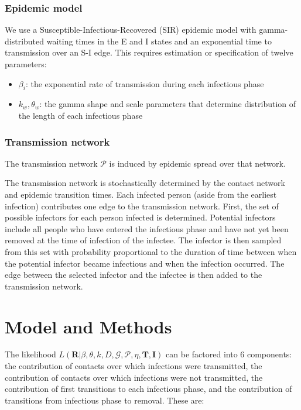 \documentclass[11pt, notitlepage]{article}%
\newcommand{\G}{\mathscr{G}}
\newcommand{\Pnet}{\mathscr{P}}
\numberwithin{equation}{section}
\begin{document}
\subsubsection{Epidemic model}

We use a Susceptible-Infectious-Recovered (SIR) epidemic model with gamma-distributed waiting times in the E and I states and an exponential time to transmission over an S-I edge. This requires estimation or specification of twelve parameters:
\begin{itemize}
\item $\beta_i$: the exponential rate of transmission during each infectious phase
\item $k_w, \theta_w$: the gamma shape and scale parameters that determine distribution of the length of each infectious phase
\end{itemize}

\subsubsection{Transmission network}

The transmission network $\Pnet$ is induced by epidemic spread over that network. 

The transmission network is stochastically determined by the contact network and epidemic transition times. Each infected person (aside from the earliest infection) contributes one edge to the transmission network. First, the set of possible infectors for each person infected is determined. Potential infectors include all people who have entered the infectious phase and have not yet been removed at the time of infection of the infectee. The infector is then sampled from this set with probability proportional to the duration of time between when the potential infector became infectious and when the infection occurred. The edge between the selected infector and the infectee is then added to the transmission network.

\section{Model and Methods}
\label{sec:model}

The likelihood $L(\mathbf{R}| \beta, \theta, k, D, \G, \Pnet, \eta, \mathbf{T}, \mathbf{I})$ can be factored into 6 components: the contribution of contacts over which infections were transmitted, the contribution of contacts over which infections were not transmitted, 
the contribution of first transitions to each infectious phase, and the contribution of transitions from infectious phase to removal. These are:
\end{document}
